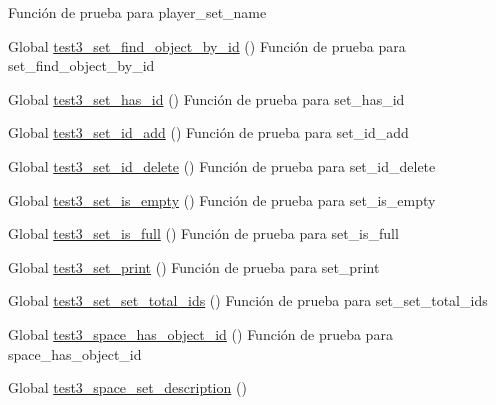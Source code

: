 \begin{DoxyRefList}
%
Función de prueba para player\+\_\+set\+\_\+name  
\item[Global \mbox{\hyperlink{set__test_8c_adc3b0aec50481d5662dbfbcdf8f114c2}{test3\+\_\+set\+\_\+find\+\_\+object\+\_\+by\+\_\+id}} ()]\label{test__test000206}%
%
Función de prueba para set\+\_\+find\+\_\+object\+\_\+by\+\_\+id  
\item[Global \mbox{\hyperlink{set__test_8c_a64322a83fd39da39e4570fbbc6976c3e}{test3\+\_\+set\+\_\+has\+\_\+id}} ()]\label{test__test000202}%
%
Función de prueba para set\+\_\+has\+\_\+id  
\item[Global \mbox{\hyperlink{set__test_8c_a6042b30d63fe74c02ff1842aa70edfba}{test3\+\_\+set\+\_\+id\+\_\+add}} ()]\label{test__test000189}%
%
Función de prueba para set\+\_\+id\+\_\+add  
\item[Global \mbox{\hyperlink{set__test_8c_a05daf3ec059faeb3b1947c760626bdb1}{test3\+\_\+set\+\_\+id\+\_\+delete}} ()]\label{test__test000193}%
%
Función de prueba para set\+\_\+id\+\_\+delete  
\item[Global \mbox{\hyperlink{set__test_8c_a9041a40207d263088ad80d4429420c81}{test3\+\_\+set\+\_\+is\+\_\+empty}} ()]\label{test__test000210}%
%
Función de prueba para set\+\_\+is\+\_\+empty  
\item[Global \mbox{\hyperlink{set__test_8c_ac9078be0a2f086b649cb04e72065e6e3}{test3\+\_\+set\+\_\+is\+\_\+full}} ()]\label{test__test000213}%
%
Función de prueba para set\+\_\+is\+\_\+full  
\item[Global \mbox{\hyperlink{set__test_8c_a46486651588b6018c403f6736db34973}{test3\+\_\+set\+\_\+print}} ()]\label{test__test000217}%
%
Función de prueba para set\+\_\+print  
\item[Global \mbox{\hyperlink{set__test_8c_adeeea6b893226fca0e9c1ba28dbe098a}{test3\+\_\+set\+\_\+set\+\_\+total\+\_\+ids}} ()]\label{test__test000197}%
%
Función de prueba para set\+\_\+set\+\_\+total\+\_\+ids  
\item[Global \mbox{\hyperlink{space__test_8c_ab520b6fd93b9e83d998cd932afd1b78a}{test3\+\_\+space\+\_\+has\+\_\+object\+\_\+id}} ()]\label{test__test000253}%
%
Función de prueba para space\+\_\+has\+\_\+object\+\_\+id  
\item[Global \mbox{\hyperlink{space__test_8c_a2599e2fdd9abd61c410faeca649402e6}{test3\+\_\+space\+\_\+set\+\_\+description}} ()]\label{test__test000260}%

\end{DoxyRefList}
